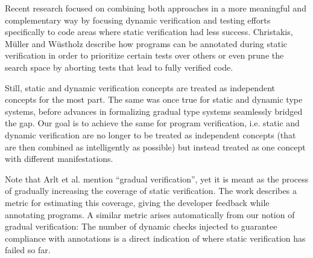 Recent research focused on combining both approaches in a more meaningful and complementary way by focusing dynamic verification and testing efforts specifically to code areas where static verification had less success.
Christakis, Müller and Wüstholz \cite{ChristakisMuellerWuestholz16} describe how programs can be annotated during static verification in order to prioritize certain tests over others or even prune the search space by aborting tests that lead to fully verified code.

Still, static and dynamic verification concepts are treated as independent concepts for the most part.
The same was once true for static and dynamic type systems, before advances in formalizing gradual type systems seamlessly bridged the gap.
Our goal is to achieve the same for program verification, i.e. static and dynamic verification are no longer to be treated as independent concepts (that are then combined as intelligently as possible) but instead treated as one concept with different manifestations.

Note that Arlt et al. \cite{arlt2014gradual} mention “gradual verification”, yet it is meant as the process of gradually increasing the coverage of static verification.
The work describes a metric for estimating this coverage, giving the developer feedback while annotating programs.
A similar metric arises automatically from our notion of gradual verification: The number of dynamic checks injected to guarantee compliance with annotations is a direct indication of where static verification has failed so far.